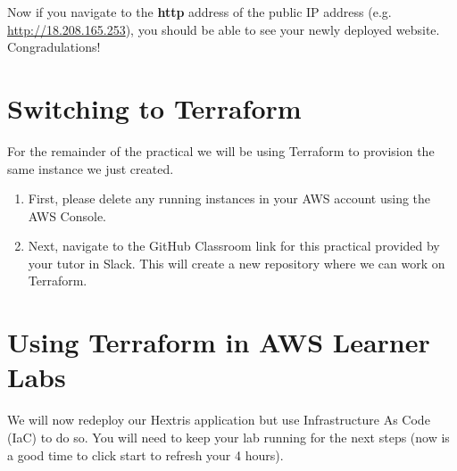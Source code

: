 \documentclass{csse4400}
\begin{document}
Now if you navigate to the \textbf{http} address of the public IP address (e.g. \url{http://18.208.165.253}), you should be able to see your newly deployed website.
Congradulations!



\section{Switching to Terraform}

For the remainder of the practical we will be using Terraform to provision the same instance we just created.

\begin{enumerate}
    \item First, please delete any running instances in your AWS account using the AWS Console.
    \item Next, navigate to the GitHub Classroom link for this practical provided by your tutor in Slack.
    This will create a new repository where we can work on Terraform.
\end{enumerate}

\section{Using Terraform in AWS Learner Labs}
We will now redeploy our Hextris application but use Infrastructure As Code (IaC) to do so.
You will need to keep your lab running for the next steps
(now is a good time to click start to refresh your 4 hours).
\end{document}
